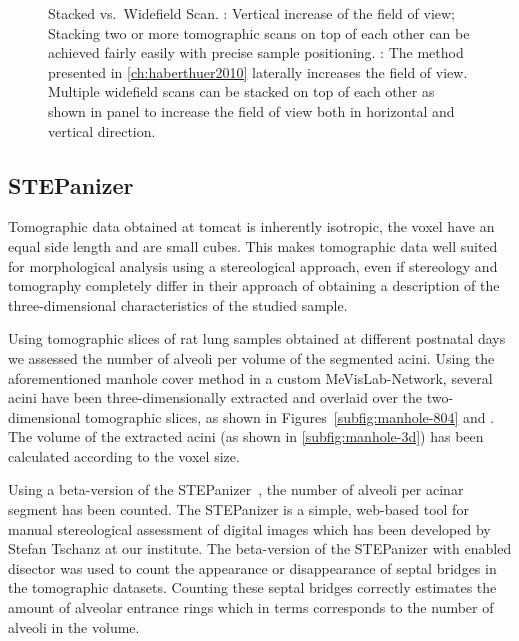 \def\scale{0.618}
\begin{figure}
	\noindent{}%
	\caption[Stacked vs.\ Widefield Scan]{Stacked vs.\ Widefield Scan. : Vertical increase of the field of view; Stacking two or more tomographic scans on top of each other can be achieved fairly easily with precise sample positioning. : The method presented in \autoref{ch:haberthuer2010} laterally increases the field of view. Multiple widefield scans can be stacked on top of each other as shown in panel  to increase the field of view both in horizontal and vertical direction.}%
	\label{fig:stack}%
\end{figure}

\subsection{STEPanizer}
Tomographic data obtained at \ac{tomcat} is inherently isotropic, \ie the voxel have an equal side length and are small cubes. This makes tomographic data well suited for morphological analysis using a stereological approach, even if stereology and tomography completely differ in their approach of obtaining a description of the three-dimensional characteristics of the studied sample.

Using tomographic slices of rat lung samples obtained at different postnatal days we assessed the number of alveoli per volume of the segmented acini. Using the aforementioned manhole cover method in a custom MeVisLab-Network, several acini have been three-dimensionally extracted and overlaid over the two-dimensional tomographic slices, as shown in Figures~\ref{subfig:manhole-804} and \label{subfig:manhole-1168}. The volume of the extracted acini (as shown in \autoref{subfig:manhole-3d}) has been calculated according to the voxel size.

Using a beta-version of the STEPanizer~\cite[available \href{http://stepanizer.com/}{online}]{Tschanz2010}, the number of alveoli per acinar segment has been counted. The STEPanizer is a simple, web-based tool for manual stereological assessment of digital images which has been developed by Stefan Tschanz at our institute. The beta-version of the STEPanizer with enabled disector was used to count the appearance or disappearance of septal bridges in the tomographic datasets. Counting these septal bridges correctly estimates the amount of alveolar entrance rings which in terms corresponds to the number of alveoli in the volume.

